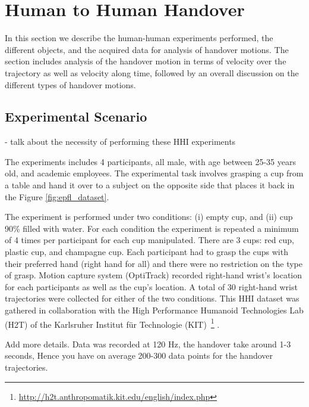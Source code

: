 \section{Human to Human Handover}
\label{sec:human}

In this section we describe the human-human experiments performed, the different objects, and the acquired data for analysis of handover motions. The section includes analysis of the handover motion in terms of velocity over the trajectory as well as velocity along time, followed by an overall discussion on the different types of handover motions. 

\subsection{Experimental Scenario}


- talk about the necessity of performing these HHI experiments 

The experiments includes 4 participants, all male, with age between 25-35 years old, and academic employees. The experimental task involves grasping a cup from a table and hand it over to a subject on the opposite side that places it back in the Figure \ref{fig:epfl_dataset}.

The experiment is performed under two conditions: (i) empty cup, and (ii) cup 90\% filled with water. For each condition the experiment is repeated a minimum of 4 times per participant for each cup manipulated. There are 3 cups: red cup, plastic cup, and champagne cup. Each participant had to grasp the cups with their preferred hand (right hand for all) and there were no restriction on the type of grasp. Motion capture system (OptiTrack) recorded right-hand wrist's location for each participants as well as the cup's location. A total of 30 right-hand wrist trajectories were collected for either of the two conditions. This HHI dataset was gathered in collaboration with the High Performance Humanoid Technologies Lab (H2T) of the Karlsruher Institut für Technologie (KIT)~\footnote{\url{http://h2t.anthropomatik.kit.edu/english/index.php}} \cite{starke_force_2019}.

Add more details. Data was recorded at 120 Hz, the handover take around 1-3 seconds, Hence you have on average 200-300 data points for the handover trajectories.

